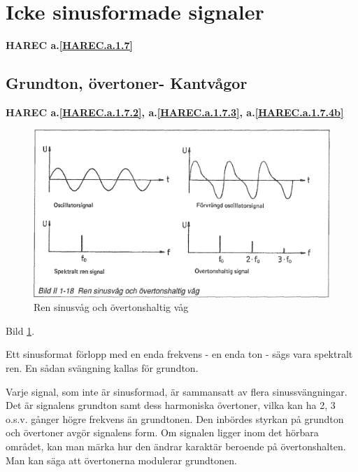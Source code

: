 \section{Icke sinusformade signaler}
\textbf{HAREC a.\ref{HAREC.a.1.7}\label{myHAREC.a.1.7}}

\subsection{Grundton, övertoner- Kantvågor}
\textbf{HAREC a.\ref{HAREC.a.1.7.2}, a.\ref{HAREC.a.1.7.3}, a.\ref{HAREC.a.1.7.4b}\label{myHAREC.a.1.7.2}\label{myHAREC.a.1.7.3}\label{myHAREC.a.1.7.4b}}

\begin{figure}
\begin{center}
\includegraphics[width=14cm]{images/bild_2_1-18}
\caption{Ren sinusvåg och övertonshaltig våg}
\label{fig:BildII1-18}
\end{center}
\end{figure}

Bild \ref{fig:BildII1-18}.

Ett sinusformat förlopp med en enda frekvens - en enda ton - sägs vara
spektralt ren. En sådan svängning kallas för grundton.

Varje signal, som inte är sinusformad, är sammansatt av flera sinussvängningar.
Det är signalens grundton samt dess harmoniska övertoner, vilka kan ha 2, 3
o.s.v. gånger högre frekvens än grundtonen. Den inbördes styrkan på grundton
och övertoner avgör signalens form. Om signalen ligger inom det hörbara
området, kan man märka hur den ändrar karaktär beroende på övertonshalten. Man
kan säga att övertonerna modulerar grundtonen.

